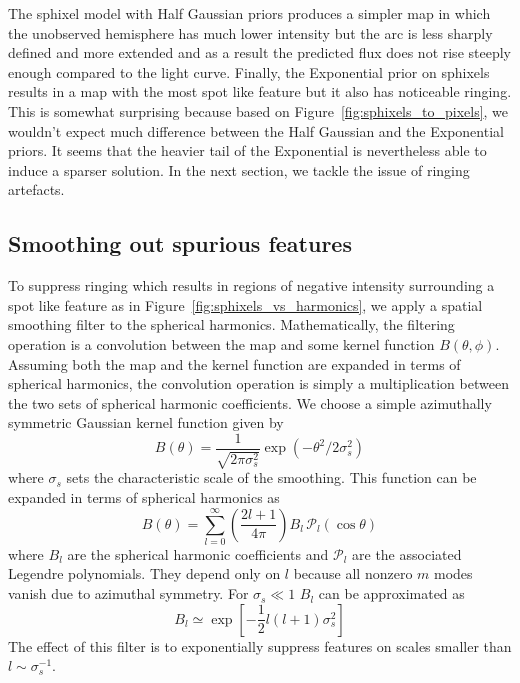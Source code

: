 \documentclass[modern]{aastex62}
\begin{document}
The sphixel model with Half Gaussian priors produces a simpler map in which the unobserved hemisphere has much lower intensity but the arc is less sharply defined and more extended and as a result the predicted flux does not rise steeply enough compared to the light curve.
Finally, the Exponential prior on sphixels results in a map with the most spot like feature but it also has noticeable ringing.
This is somewhat surprising because based on Figure~\ref{fig:sphixels_to_pixels}, we wouldn't expect much difference between the Half Gaussian and the Exponential priors.
It seems that the heavier tail of the Exponential is nevertheless able to induce a sparser solution.
In the next section, we tackle the issue of ringing artefacts.

\subsection{Smoothing out spurious features}
\label{ssec:spurious_features}
To suppress ringing which results in regions of negative intensity surrounding a spot like feature as in Figure~\ref{fig:sphixels_vs_harmonics}, we apply a spatial smoothing filter to the spherical harmonics.
Mathematically, the filtering operation is a convolution between the map and some kernel function $B(\theta,\phi)$.
Assuming both the map and the kernel function are expanded in terms of spherical harmonics, the convolution operation is simply a multiplication between the two sets of spherical harmonic coefficients.
We choose a simple azimuthally symmetric Gaussian kernel function given by
\begin{equation}
    B(\theta)=\frac{1}{\sqrt{2 \pi \sigma_s^{2}}}\exp \left(-\theta^{2} / 2 \sigma_s^{2}\right)
\end{equation}
where $\sigma_s$ sets the characteristic scale of the smoothing.
This function can be expanded in terms of spherical harmonics as
\begin{equation}
    B(\theta)=\sum_{l=0}^{\infty}\left(\frac{2 l+1}{4 \pi}\right) B_{l} \,\mathcal{P}_{l}(\cos \theta)
\end{equation}
where $B_l$ are the spherical harmonic coefficients and $\mathcal{P}_l$ are the associated Legendre polynomials.
They depend only on $l$ because all nonzero $m$ modes vanish due to azimuthal symmetry.
For $\sigma_s\ll 1$ $B_l$ can be approximated as \citep{seon2007,white1995}
\begin{equation}
    B_l\simeq \exp\left[-\frac{1}{2}l(l+1)\sigma_s^2\right]
\end{equation}
The effect of this filter is to exponentially suppress features on scales smaller than $l\sim \sigma_s^{-1}$.
\end{document}
